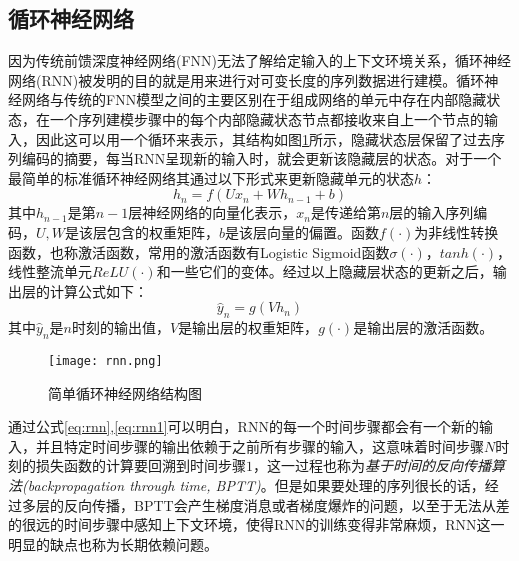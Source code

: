 
\subsection{循环神经网络}

因为传统前馈深度神经网络(FNN)无法了解给定输入的上下文环境关系，循环神经网络(RNN)被发明的目的就是用来进行对可变长度的序列数据进行建模。循环神经网络与传统的FNN模型之间的主要区别在于组成网络的单元中存在内部隐藏状态，在一个序列建模步骤中的每个内部隐藏状态节点都接收来自上一个节点的输入，因此这可以用一个循环来表示，其结构如图\ref{fig:rnn}所示，隐藏状态层保留了过去序列编码的摘要，每当RNN呈现新的输入时，就会更新该隐藏层的状态。对于一个最简单的标准循环神经网络其通过以下形式来更新隐藏单元的状态$h$：
\begin{equation}
  \label{eq:rnn}
  h_{n} = f \left(Ux_{n} + Wh_{n-1} + b \right)
\end{equation}
其中$h_{n-1}$是第$n-1$层神经网络的向量化表示，$x_{n}$是传递给第$n$层的输入序列编码，$U,W$是该层包含的权重矩阵，$b$是该层向量的偏置。函数$f(\cdot)$为非线性转换函数，也称激活函数，常用的激活函数有Logistic Sigmoid函数$\sigma(\cdot )$，$tanh(\cdot)$，线性整流单元$ReLU(\cdot)$和一些它们的变体。经过以上隐藏层状态的更新之后，输出层的计算公式如下：
\begin{equation}
  \label{eq:rnn1}
  \hat{y}_{n} = g(Vh_{n})
\end{equation}
其中$\hat{y}_{n}$是$n$时刻的输出值，$V$是输出层的权重矩阵，$g(\cdot)$是输出层的激活函数。

\begin{figure}[htb]%
  \centering
  \texttt{[image: rnn.png]}\\
  \caption{简单循环神经网络结构图}
  \label{fig:rnn}
\end{figure}

通过公式\ref{eq:rnn},\ref{eq:rnn1}可以明白，RNN的每一个时间步骤都会有一个新的输入，并且特定时间步骤的输出依赖于之前所有步骤的输入，这意味着时间步骤$N$时刻的损失函数的计算要回溯到时间步骤$1$，这一过程也称为\textit{基于时间的反向传播算法(backpropagation through time, BPTT)}。但是如果要处理的序列很长的话，经过多层的反向传播，BPTT会产生梯度消息或者梯度爆炸的问题，以至于无法从差的很远的时间步骤中感知上下文环境，使得RNN的训练变得非常麻烦，RNN这一明显的缺点也称为长期依赖问题。

